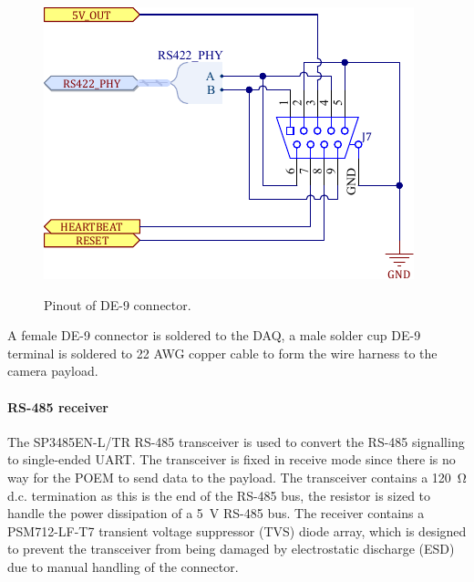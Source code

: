 \documentclass[a4paper,11pt]{article}
\begin{document}
\begin{figure}[H]
  \centering
  \includegraphics[width=\linewidth]{images/de-9-connector.pdf}
  \label{fig:de-9-connector}
  \caption{Pinout of DE-9 connector.}
\end{figure}

A female DE-9 connector is soldered to the DAQ, a male solder cup DE-9 terminal is soldered to 22 AWG copper cable to form the wire harness to the camera payload.

\paragraph{RS-485 receiver}
The SP3485EN-L/TR RS-485 transceiver is used to convert the RS-485 signalling to single-ended UART. The transceiver is fixed in receive mode since there is no way for the POEM to send data to the payload. The transceiver contains a \SI{120}{\ohm} d.c. termination as this is the end of the RS-485 bus, the resistor is sized to handle the power dissipation of a \SI{5}{\volt} RS-485 bus. The receiver contains a PSM712-LF-T7 transient voltage suppressor (TVS) diode array, which is designed to prevent the transceiver from being damaged by electrostatic discharge (ESD) due to manual handling of the connector.
\end{document}
